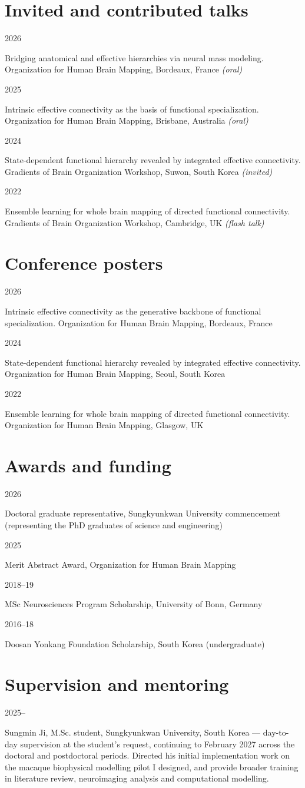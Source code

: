 \documentclass[11pt]{article}
\newcommand{\dated}[2]{%
  \begin{minipage}[t]{0.10\textwidth}\small #1\end{minipage}%
  \begin{minipage}[t]{0.89\textwidth}#2\end{minipage}\par\smallskip}
\begin{document}
\section{Invited and contributed talks}
\dated{2026}{Bridging anatomical and effective hierarchies via neural mass modeling.
Organization for Human Brain Mapping, Bordeaux, France \textit{(oral)}}
\dated{2025}{Intrinsic effective connectivity as the basis of functional specialization.
Organization for Human Brain Mapping, Brisbane, Australia \textit{(oral)}}
\dated{2024}{State-dependent functional hierarchy revealed by integrated effective connectivity.
Gradients of Brain Organization Workshop, Suwon, South Korea \textit{(invited)}}

\dated{2022}{Ensemble learning for whole brain mapping of directed functional connectivity.
Gradients of Brain Organization Workshop, Cambridge, UK \textit{(flash talk)}}

\section{Conference posters}
\dated{2026}{Intrinsic effective connectivity as the generative backbone of functional specialization.
Organization for Human Brain Mapping, Bordeaux, France}
\dated{2024}{State-dependent functional hierarchy revealed by integrated effective connectivity.
Organization for Human Brain Mapping, Seoul, South Korea}

\dated{2022}{Ensemble learning for whole brain mapping of directed functional connectivity.
Organization for Human Brain Mapping, Glasgow, UK}

\section{Awards and funding}
\dated{2026}{Doctoral graduate representative, Sungkyunkwan University commencement (representing the PhD graduates of science and engineering)}
\dated{2025}{Merit Abstract Award, Organization for Human Brain Mapping}
\dated{2018--19}{MSc Neurosciences Program Scholarship, University of Bonn, Germany}
\dated{2016--18}{Doosan Yonkang Foundation Scholarship, South Korea (undergraduate)}

\section{Supervision and mentoring}
\dated{2025--}{Sungmin Ji, M.Sc. student, Sungkyunkwan University, South Korea --- day-to-day supervision at
the student's request, continuing to February 2027 across the doctoral and postdoctoral periods.
Directed his initial implementation work on the macaque biophysical modelling pilot I designed, and
provide broader training in literature review, neuroimaging analysis and computational modelling.}
\end{document}
